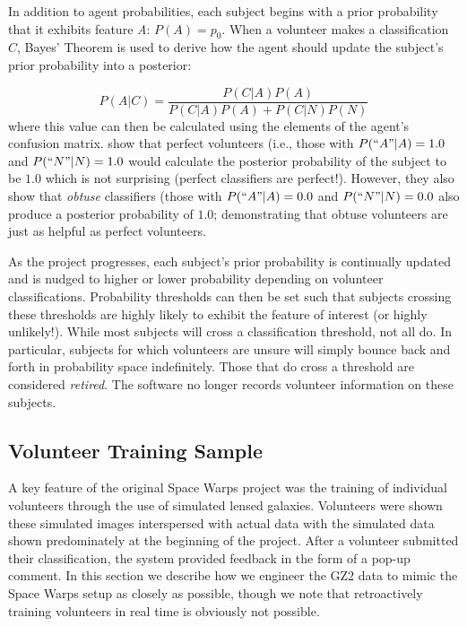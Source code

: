\documentclass[twocolumn]{aastex6}
\newcommand{\A}{\textit{A}}
\begin{document}
In addition to agent probabilities, each subject begins with a prior probability 
that it exhibits feature \A: $P(A) = p_0$. 
When a volunteer makes a classification $C$, Bayes' Theorem is used to derive how 
the agent should update the subject's prior probability into a posterior: 

\begin{equation}
P(A|C) = \frac{ P(C|A) P(A) }{P(C|A) P(A) + P(C|N) P(N)}
\end{equation}
where this value can then be calculated using the elements of the agent's 
confusion matrix. \cite{Marshall2016} show that perfect volunteers (i.e., those 
with $P(``A"| A) = 1.0$ and $P(``N" | N) = 1.0$ would calculate the posterior
probability of the subject to be $1.0$ which is not surprising (perfect classifiers 
are perfect!). However, they also show that \textit{obtuse} classifiers (those with 
$P(``A" | A) = 0.0$ and $P(``N" | N) = 0.0$ also produce a posterior probability 
of $1.0$; demonstrating that obtuse volunteers are just as helpful as perfect volunteers.

As the project progresses, each subject's prior probability is continually updated 
and is nudged to higher or lower probability depending on volunteer classifications.
Probability thresholds can then be set such that subjects crossing these thresholds 
are highly likely to exhibit the feature of interest (or highly unlikely!). While most subjects
will cross a classification threshold, not all do. In particular, subjects for 
which volunteers are unsure will simply bounce back and forth in probability space indefinitely. 
Those that do cross a threshold are considered \textit{retired}. The software no
longer records volunteer information on these subjects. 



\subsection{Volunteer Training Sample}\label{sec: training sample}

A key feature of the original Space Warps project was the training of 
individual volunteers through the use of simulated lensed galaxies. Volunteers were 
shown these simulated images interspersed with actual data with the simulated data shown
predominately at the beginning of the project. After a volunteer submitted their 
classification, the system provided feedback in the form of a pop-up comment. 
In this section we describe how we engineer the GZ2 data to mimic the Space 
Warps setup as closely as possible, though we note that retroactively training 
volunteers in real time is obviously not possible. 
\end{document}
